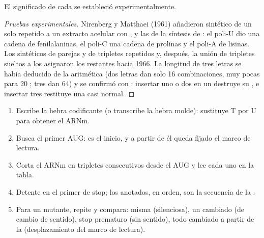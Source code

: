 \begin{proposition}\label{prop:g11:gene-expression:readcode}
El significado de cada  se estableció experimentalmente.
\end{proposition}
\begin{proof}[Pruebas experimentales]
Nirenberg y Matthaei (1961) añadieron  sintético de un solo
 repetido a un extracto acelular con ,  y
las  de la síntesis de : el poli-U dio una cadena de
fenilalaninas, el poli-C una cadena de prolinas y el poli-A de lisinas.
Los  sintéticos de parejas y de tripletes repetidos y, después, la
unión de tripletes sueltos a los  asignaron los 
restantes hacia 1966. La longitud de tres letras se había deducido de
la aritmética (dos letras dan solo 16 combinaciones, muy pocas para 20
; tres dan 64) y se confirmó con : insertar uno o
dos  en un  destruye su , e insertar tres
restituye una casi normal.
\end{proof}

\begin{method}\label{met:g11:gene-expression:translate}
\begin{enumerate}
  \item Escribe la hebra codificante (o transcribe la hebra molde):
        sustituye T por U para obtener el ARNm.
  \item Busca el primer AUG: es el inicio, y a partir de él queda fijado
        el marco de lectura.
  \item Corta el ARNm en tripletes consecutivos desde el AUG y lee cada
        uno en la tabla.
  \item Detente en el primer  de stop; los  anotados,
        en orden, son la secuencia de la .
  \item Para un mutante, repite y compara: misma 
        (silenciosa), un  cambiado (de cambio de sentido),
        stop prematuro (sin sentido), todo cambiado a partir de la
         (desplazamiento del marco de lectura).
\end{enumerate}
\end{method}

